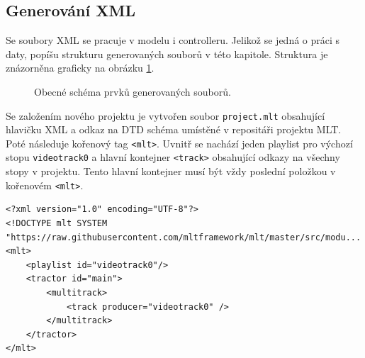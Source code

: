 \subsection{Generování XML}
Se soubory XML se pracuje v modelu i controlleru. Jelikož se jedná o práci s daty, popíšu strukturu generovaných souborů v této kapitole. Struktura je znázorněna graficky na obrázku \ref{img:schemaXML}.
\begin{figure}[h]
	\centering
	\caption{Obecné schéma prvků generovaných souborů.}\label{img:schemaXML}
\end{figure}

Se založením nového projektu je vytvořen soubor \texttt{project.mlt} obsahující hlavičku XML a odkaz na DTD schéma umístěné v repositáři projektu MLT. Poté následuje kořenový tag \texttt{<mlt>}. Uvnitř se nachází jeden playlist pro výchozí stopu \texttt{videotrack0} a hlavní kontejner \texttt{<track>} obsahující odkazy na všechny stopy v projektu. Tento hlavní kontejner musí být vždy poslední položkou v kořenovém \texttt{<mlt>}.
\begin{lstlisting}[style=xml]
<?xml version="1.0" encoding="UTF-8"?>
<!DOCTYPE mlt SYSTEM "https://raw.githubusercontent.com/mltframework/mlt/master/src/modu...
<mlt>
    <playlist id="videotrack0"/>
    <tractor id="main">
        <multitrack>
            <track producer="videotrack0" />
        </multitrack>
    </tractor>
</mlt>
\end{lstlisting}

